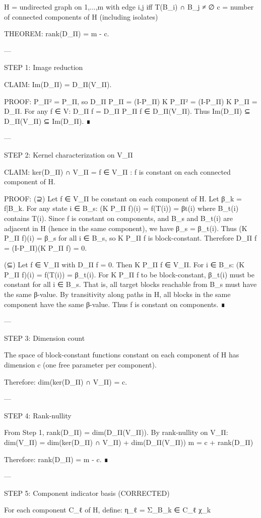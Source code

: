 H = undirected graph on {1,...,m} with edge {i,j} iff T(B_i) ∩ B_j ≠ ∅
c = number of connected components of H (including isolates)

THEOREM: rank(D_Π) = m - c.


---

STEP 1: Image reduction

CLAIM: Im(D_Π) = D_Π(V_Π).

PROOF: P_Π² = P_Π, so D_Π P_Π = (I-P_Π) K P_Π² = (I-P_Π) K P_Π = D_Π.
For any f ∈ V: D_Π f = D_Π P_Π f ∈ D_Π(V_Π).
Thus Im(D_Π) ⊆ D_Π(V_Π) ⊆ Im(D_Π). ∎


---

STEP 2: Kernel characterization on V_Π

CLAIM: ker(D_Π) ∩ V_Π = {f ∈ V_Π : f is constant on each connected component of H}.

PROOF:
(⊇) Let f ∈ V_Π be constant on each component of H. Let β_k = f|{B_k}.
For any state i ∈ B_s: (K P_Π f)(i) = f(T(i)) = β{t(i)} where B_{t(i)} contains T(i).
Since f is constant on components, and B_s and B_{t(i)} are adjacent in H
(hence in the same component), we have β_s = β_{t(i)}.
Thus (K P_Π f)(i) = β_s for all i ∈ B_s, so K P_Π f is block-constant.
Therefore D_Π f = (I-P_Π)(K P_Π f) = 0.

(⊆) Let f ∈ V_Π with D_Π f = 0. Then K P_Π f ∈ V_Π.
For i ∈ B_s: (K P_Π f)(i) = f(T(i)) = β_{t(i)}.
For K P_Π f to be block-constant, β_{t(i)} must be constant for all i ∈ B_s.
That is, all target blocks reachable from B_s must have the same β-value.
By transitivity along paths in H, all blocks in the same component have the
same β-value. Thus f is constant on components. ∎


---

STEP 3: Dimension count

The space of block-constant functions constant on each component of H has
dimension c (one free parameter per component).

Therefore: dim(ker(D_Π) ∩ V_Π) = c.


---

STEP 4: Rank-nullity

From Step 1, rank(D_Π) = dim(D_Π(V_Π)).
By rank-nullity on V_Π:
dim(V_Π) = dim(ker(D_Π) ∩ V_Π) + dim(D_Π(V_Π))
m = c + rank(D_Π)

Therefore: rank(D_Π) = m - c. ∎


---

STEP 5: Component indicator basis (CORRECTED)

For each component C_ℓ of H, define:
η_ℓ = Σ_{B_k ∈ C_ℓ} χ_k

